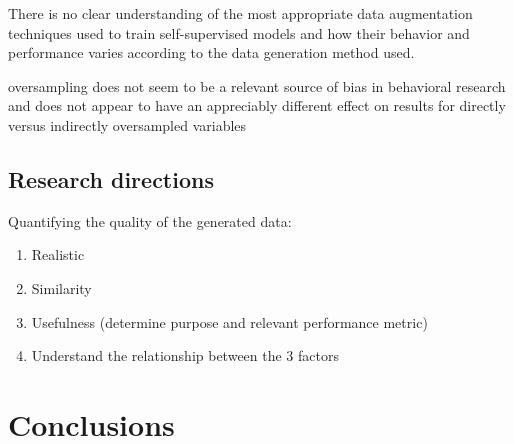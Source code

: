\documentclass[parskip=full]{scrartcl}
\begin{document}


There is no clear understanding of the most appropriate data augmentation
techniques used to train self-supervised models and how their behavior and
performance varies according to the data generation method used.


oversampling does not seem to be a relevant source of bias in behavioral
research and does not appear to have an appreciably different effect on
results for directly versus indirectly oversampled
variables~\cite{hauner2014latent}


\subsection{Research directions}


Quantifying the quality of the generated data:

\begin{enumerate}
    \item Realistic
    \item Similarity
    \item Usefulness (determine purpose and relevant performance metric)
    \item Understand the relationship between the 3 factors
\end{enumerate}

\section{Conclusions}~\label{sec:conclusions}

\printbibliography
\end{document}
